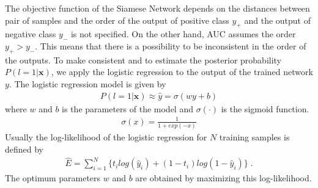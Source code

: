 \documentclass[a4paper,12pt]{article}
\begin{document}


The objective function of the Siamese Network depends on the distances between pair of samples and the order of the output of positive class $y_+$ and the output of negative class $y_-$ is not specified.
On the other hand, AUC assumes the order $y_+ > y_-$.
This means that there is a possibility to be inconsistent in the order of the outputs.
To make consistent and to estimate the posterior probability $P(l=1|\bm{x})$, we apply the logistic regression to the output of the trained network $y$. 
The logistic regression model is given by
\begin{align} \label{eq:regression}
    P(l=1|\bm{x}) \approx \hat{y} = \sigma(w y+b)
\end{align}
where $w$ and $b$ is the parameters of the model and $\sigma(\cdot)$ is the sigmoid function.
\begin{align}  \label{eq:sigmoid}
\sigma(x) = \frac{1}{1+exp(-x)}
\end{align}
Usually the log-likelihood of the logistic regression for $N$ training samples is defined by
\begin{align} \label{eq:crossentropy}
    \hat{E} = \sum_{i=1}^N \{ t_i log(\hat{y}_i) + (1-t_i) log(1-\hat{y}_i) \} \; .
\end{align}
The optimum parameters $w$ and $b$ are obtained by maximizing this log-likelihood.

\end{document}

